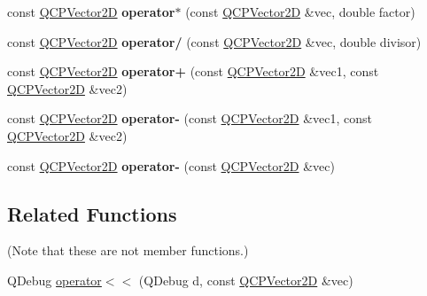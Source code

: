 \begin{DoxyCompactItemize}
\item 
const \hyperlink{class_q_c_p_vector2_d}{Q\+C\+P\+Vector2D} {\bfseries operator$\ast$} (const \hyperlink{class_q_c_p_vector2_d}{Q\+C\+P\+Vector2D} \&vec, double factor)\hypertarget{class_q_c_p_vector2_d_aace10d28a76e84e7380ede1a9cb58274}{}\label{class_q_c_p_vector2_d_aace10d28a76e84e7380ede1a9cb58274}

\item 
const \hyperlink{class_q_c_p_vector2_d}{Q\+C\+P\+Vector2D} {\bfseries operator/} (const \hyperlink{class_q_c_p_vector2_d}{Q\+C\+P\+Vector2D} \&vec, double divisor)\hypertarget{class_q_c_p_vector2_d_aa69909afc8c656999a2ea292ea01244b}{}\label{class_q_c_p_vector2_d_aa69909afc8c656999a2ea292ea01244b}

\item 
const \hyperlink{class_q_c_p_vector2_d}{Q\+C\+P\+Vector2D} {\bfseries operator+} (const \hyperlink{class_q_c_p_vector2_d}{Q\+C\+P\+Vector2D} \&vec1, const \hyperlink{class_q_c_p_vector2_d}{Q\+C\+P\+Vector2D} \&vec2)\hypertarget{class_q_c_p_vector2_d_a24cc5985429b12dbed4d0d3c5a917d20}{}\label{class_q_c_p_vector2_d_a24cc5985429b12dbed4d0d3c5a917d20}

\item 
const \hyperlink{class_q_c_p_vector2_d}{Q\+C\+P\+Vector2D} {\bfseries operator-\/} (const \hyperlink{class_q_c_p_vector2_d}{Q\+C\+P\+Vector2D} \&vec1, const \hyperlink{class_q_c_p_vector2_d}{Q\+C\+P\+Vector2D} \&vec2)\hypertarget{class_q_c_p_vector2_d_a9e01331d8debf0877ee4cba9abd83605}{}\label{class_q_c_p_vector2_d_a9e01331d8debf0877ee4cba9abd83605}

\item 
const \hyperlink{class_q_c_p_vector2_d}{Q\+C\+P\+Vector2D} {\bfseries operator-\/} (const \hyperlink{class_q_c_p_vector2_d}{Q\+C\+P\+Vector2D} \&vec)\hypertarget{class_q_c_p_vector2_d_a14c807d345ee3f22d6809bb5a4137b52}{}\label{class_q_c_p_vector2_d_a14c807d345ee3f22d6809bb5a4137b52}

\end{DoxyCompactItemize}
\subsection*{Related Functions}
(Note that these are not member functions.) \begin{DoxyCompactItemize}
\item 
Q\+Debug \hyperlink{class_q_c_p_vector2_d_a6c757af9671d925af4a36c2f58fb7234}{operator$<$$<$} (Q\+Debug d, const \hyperlink{class_q_c_p_vector2_d}{Q\+C\+P\+Vector2D} \&vec)
\end{DoxyCompactItemize}


